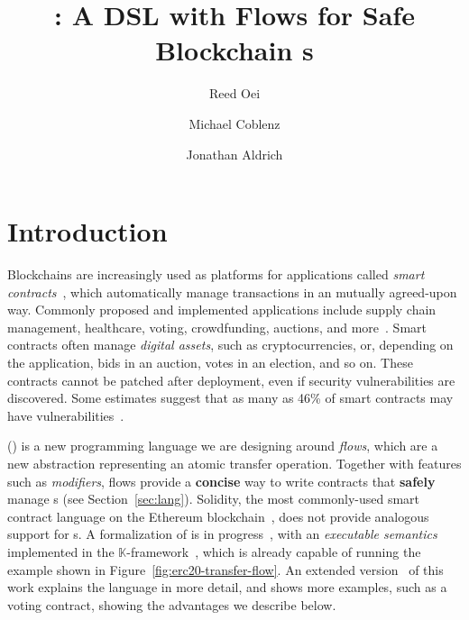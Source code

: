 \documentclass[dvipsnames,runningheads]{llncs}
\begin{document}
\title{\langName: A DSL with Flows for Safe Blockchain \AssetTxt{}s}

\author{Reed Oei \and Michael Coblenz \and Jonathan Aldrich}

\maketitle

\section{Introduction}
\vspace{-0.5em}
Blockchains are increasingly used as platforms for applications called \emph{smart contracts}~\cite{Szabo97:Formalizing}, which automatically manage transactions in an mutually agreed-upon way.
Commonly proposed and implemented applications include supply chain management, healthcare, voting, crowdfunding, auctions, and more~\cite{SupplyChainUse,HealthcareUse,Elsden18:Making}.
Smart contracts often manage \emph{digital assets}, such as cryptocurrencies, or, depending on the application, bids in an auction, votes in an election, and so on.
These contracts cannot be patched after deployment, even if security vulnerabilities are discovered.
Some estimates suggest that as many as 46\% of smart contracts may have vulnerabilities~\cite{luuOyente}.

\langName (\langNamePronounce) is a new programming language we are designing around \emph{flows}, which are a new abstraction representing an atomic transfer operation.
Together with features such as \emph{modifiers}, flows provide a \textbf{concise} way to write contracts that \textbf{safely} manage \assetTxt{}s (see Section~\ref{sec:lang}).
Solidity, the most commonly-used smart contract language on the Ethereum blockchain~\cite{EthereumForDevs}, does not provide analogous support for \assetTxt{}s.
A formalization of \langName is in progress~\cite{psamatheRepo}, with an \emph{executable semantics} implemented in the $\mathbb{K}$-framework~\cite{rosu-serbanuta-2010-jlap}, which is already capable of running the example shown in Figure~\ref{fig:erc20-transfer-flow}.
An extended version~\cite{psamatheExtended} of this work explains the language in more detail, and shows more examples, such as a voting contract, showing the advantages we describe below.
\end{document}
